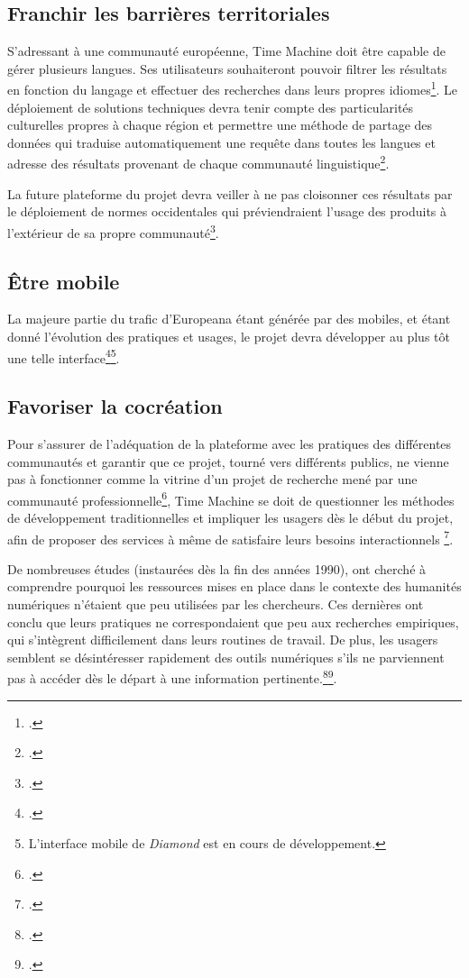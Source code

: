 \subsection{Franchir les barrières territoriales}

S'adressant à une communauté européenne, Time Machine doit être capable de gérer plusieurs langues. Ses utilisateurs souhaiteront pouvoir filtrer les résultats en fonction du langage et effectuer des recherches dans leurs propres idiomes\footcite{xie_discover_2016}. Le déploiement de solutions techniques devra tenir compte des particularités culturelles propres à chaque région et permettre une méthode de partage des données qui traduise automatiquement une requête dans toutes les langues et adresse des résultats provenant de chaque communauté linguistique\footcite{diekema_multilinguality_2012}.

La future plateforme du projet devra veiller à ne pas cloisonner ces résultats par le déploiement de normes occidentales qui préviendraient l'usage des produits à l'extérieur de sa propre communauté\footcite{jones_public_2017}.

\subsection{Être mobile}

La majeure partie du trafic d'Europeana étant générée par des mobiles, et étant donné l'évolution des pratiques et usages, le projet devra développer au plus tôt une telle interface\footcite{xie_discover_2016}\footnote{L'interface mobile de \textit{Diamond} est en cours de développement.}.

\subsection{Favoriser la cocréation}

Pour s'assurer de l'adéquation de la plateforme avec les pratiques des différentes communautés et garantir que ce projet, tourné vers différents publics, ne vienne pas à fonctionner comme la vitrine d'un projet de recherche mené par une communauté professionnelle\footcite{moatti_bibliotheque_2012}, Time Machine se doit de questionner les méthodes de développement traditionnelles et impliquer les usagers dès le début du projet, afin de proposer des services à même de satisfaire leurs besoins interactionnels \footcite[p.7]{dunning_digitising_2009}.

De nombreuses études (instaurées dès la fin des années 1990), ont cherché à comprendre pourquoi les ressources mises en place dans le contexte des humanités numériques n'étaient que peu utilisées par les chercheurs. Ces dernières ont conclu que leurs pratiques ne correspondaient que peu aux recherches empiriques, qui s'intègrent difficilement dans leurs routines de travail. De plus, les usagers semblent se désintéresser rapidement des outils numériques s'ils ne parviennent pas à accéder dès le départ à une information pertinente.\footcite{warwick_digital_2012}\footcite{warwick_studying_2012}. 

